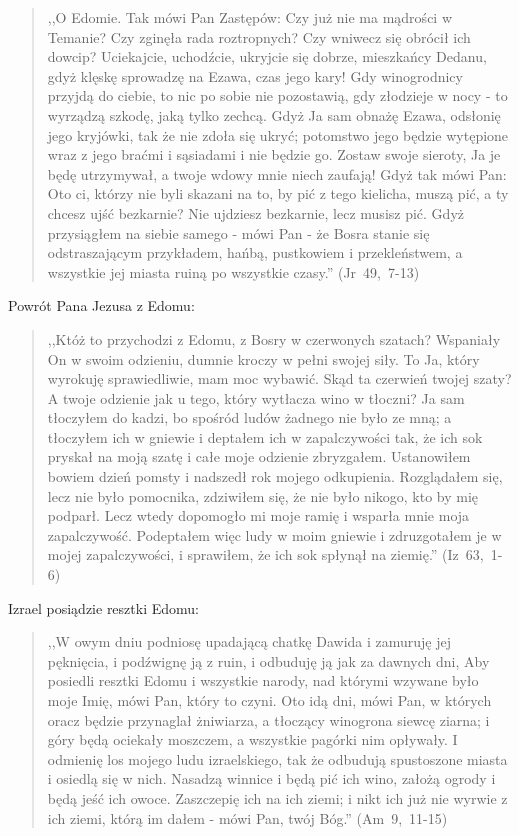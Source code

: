 \documentclass[10pt,a4paper,oneside]{article}
\begin{document}
\begin{quote}
,,O Edomie. Tak mówi Pan Zastępów: Czy już nie ma mądrości w Temanie? Czy zginęła rada roztropnych? Czy wniwecz się obrócił ich dowcip? Uciekajcie, uchodźcie, ukryjcie się dobrze, mieszkańcy Dedanu, gdyż klęskę sprowadzę na Ezawa, czas jego kary! Gdy winogrodnicy przyjdą do ciebie, to nic po sobie nie pozostawią, gdy złodzieje w nocy - to wyrządzą szkodę, jaką tylko zechcą. Gdyż Ja sam obnażę Ezawa, odsłonię jego kryjówki, tak że nie zdoła się ukryć; potomstwo jego będzie wytępione wraz z jego braćmi i sąsiadami i nie będzie go. Zostaw swoje sieroty, Ja je będę utrzymywał, a twoje wdowy mnie niech zaufają! Gdyż tak mówi Pan: Oto ci, którzy nie byli skazani na to, by pić z tego kielicha, muszą pić, a ty chcesz ujść bezkarnie? Nie ujdziesz bezkarnie, lecz musisz pić. Gdyż przysiągłem na siebie samego - mówi Pan - że Bosra stanie się odstraszającym przykładem, hańbą, pustkowiem i przekleństwem, a wszystkie jej miasta ruiną po wszystkie czasy.'' \mbox{(Jr 49, 7-13)}
\end{quote}
Powrót Pana Jezusa z Edomu:
\begin{quote}
,,Któż to przychodzi z Edomu, z Bosry w czerwonych szatach? Wspaniały On w swoim odzieniu, dumnie kroczy w pełni swojej siły. To Ja, który wyrokuję sprawiedliwie, mam moc wybawić. Skąd ta czerwień twojej szaty? A twoje odzienie jak u tego, który wytłacza wino w tłoczni? Ja sam tłoczyłem do kadzi, bo spośród ludów żadnego nie było ze mną; a tłoczyłem ich w gniewie i deptałem ich w zapalczywości tak, że ich sok pryskał na moją szatę i całe moje odzienie zbryzgałem. Ustanowiłem bowiem dzień pomsty i nadszedł rok mojego odkupienia. Rozglądałem się, lecz nie było pomocnika, zdziwiłem się, że nie było nikogo, kto by mię podparł. Lecz wtedy dopomogło mi moje ramię i wsparła mnie moja zapalczywość. Podeptałem więc ludy w moim gniewie i zdruzgotałem je w mojej zapalczywości, i sprawiłem, że ich sok spłynął na ziemię.'' \mbox{(Iz 63, 1-6)}
\end{quote}
Izrael posiądzie resztki Edomu:
\begin{quote}
,,W owym dniu podniosę upadającą chatkę Dawida i zamuruję jej pęknięcia, i podźwignę ją z ruin, i odbuduję ją jak za dawnych dni, Aby posiedli resztki Edomu i wszystkie narody, nad którymi wzywane było moje Imię, mówi Pan, który to czyni. Oto idą dni, mówi Pan, w których oracz będzie przynaglał żniwiarza, a tłoczący winogrona siewcę ziarna; i góry będą ociekały moszczem, a wszystkie pagórki nim opływały. I odmienię los mojego ludu izraelskiego, tak że odbudują spustoszone miasta i osiedlą się w nich. Nasadzą winnice i będą pić ich wino, założą ogrody i będą jeść ich owoce. Zaszczepię ich na ich ziemi; i nikt ich już nie wyrwie z ich ziemi, którą im dałem - mówi Pan, twój Bóg.'' \mbox{(Am 9, 11-15)}
\end{quote}
\end{document}
